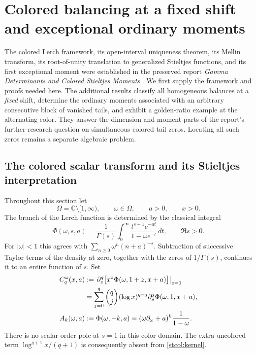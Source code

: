 \section{Colored balancing at a fixed shift and exceptional ordinary moments}
\label{stcol:section}

The colored Lerch framework, its open-interval uniqueness theorem, its
Mellin transform, its root-of-unity translation to generalized Stieltjes
functions, and its first exceptional moment were established in the
preserved report \emph{Gamma Determinants and Colored Stieltjes Moments}
\cite{stcol:report}.  We first supply the framework and proofs needed
here.  The additional results classify all homogeneous balances at a
\emph{fixed} shift, determine the ordinary moments associated with an
arbitrary consecutive block of vanished tails, and exhibit a golden-ratio
example at the alternating color.  They answer the dimension and moment
parts of the report's further-research question on simultaneous colored
tail zeros.  Locating all such zeros remains a separate algebraic problem.

\subsection{The colored scalar transform and its Stieltjes interpretation}

Throughout this section let
\[
 \Omega=\mathbb C\setminus[1,\infty),\qquad
 \omega\in\Omega,\qquad a>0,\qquad x>0.
\]
The branch of the Lerch function is determined by the classical integral
\cite[Eq.~25.14.5]{tw:DLMFLerch}
\begin{equation}\label{stcol:lerch}
 \Phi(\omega,s,a)
 =\frac1{\Gamma(s)}\int_0^\infty
       \frac{t^{s-1}e^{-at}}{1-\omega e^{-t}}\,dt,
 \qquad \Re s>0.
\end{equation}
For $|\omega|<1$ this agrees with
$\sum_{n\ge0}\omega^n(n+a)^{-s}$.  Subtraction of successive Taylor
terms of the density at zero, together with the zeros of $1/\Gamma(s)$,
continues it to an entire function of $s$.  Set
\begin{align}
 C_q^\omega(x,a)
  &:=\left.\partial_z^q\bigl[x^z\Phi(\omega,1+z,x+a)\bigr]\right|_{z=0}
       \label{stcol:kernel}\\
  &=\sum_{j=0}^q\binom qj(\log x)^{q-j}
                     \partial_s^j\Phi(\omega,1,x+a),\notag\\
 A_k(\omega,a)&:=\Phi(\omega,-k,a)
       =(\omega\partial_\omega+a)^k\frac1{1-\omega}.
       \label{stcol:tails}
\end{align}
There is no scalar order pole at $s=1$ in this color domain.  The extra
uncolored term $\log^{q+1}x/(q+1)$ is consequently absent from
\eqref{stcol:kernel}.

